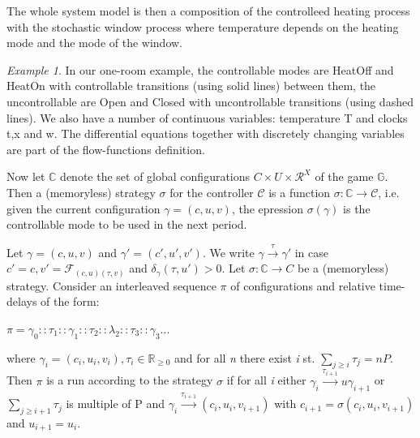     The whole system model is then a composition of the controlleed heating process
    with the stochastic window process where temperature depends on the heating  mode 
    and the mode of the window. 


    \emph{Example 1}. In our one-room example, the controllable modes are {\color{RawSienna} HeatOff}
    and {\color{RawSienna} HeatOn} with controllable transitions (using solid lines) between
    them, the uncontrollable are {\color{RawSienna} Open} and {\color{RawSienna} Closed} with
    uncontrollable transitions (using dashed lines). We also have a number of continuous 
    variables: temperature T and clocks t,x and w. The differential equations together with
    discretely changing variables are part of the flow-functions definition.

    Now let $\mathbb{C}$ denote the set of global configurations $C\times U \times \mathcal{R}^X$
    of the game $\mathbb{G}$. Then a (memoryless) strategy $\sigma$ for the controller $\mathcal{C}$
    is a function $\sigma: \mathbb{C} \rightarrow \mathcal{C}$, i.e. given the current
    configuration $\gamma = (c,u,v)$, the epression $\sigma(\gamma)$ is the controllable mode
    to be used in the next period.

    Let $\gamma = (c,u,v)$ and $\gamma' = (c',u',v')$. We write $\gamma \xrightarrow{\tau} \gamma'$ 
    in case $c'=c, v'=\mathcal{F}_{(c,u)(\tau,v)}$ and $\delta_{\gamma}(\tau,u') > 0$. Let $\sigma: \mathbb{C} \rightarrow C$
    be a (memoryless) strategy. Consider an interleaved sequence $\pi$ of configurations and
    relative time-delays of the form:
    
    \begin{center}
      $\pi = \gamma_0 :: \tau_1 :: \gamma_1 :: \tau_2 :: \lambda_2 :: \tau_3 :: \gamma_3 ...$  
    \end{center}


    where $\gamma_i = (c_i,u_i,v_i), \tau_i \in \mathbb{R}_{\geqslant 0}$ and for all \emph{n} 
    there  exist \emph{i} st. $\sum_{j \geqslant i}\tau_j = nP$. Then $\pi$ is a run according
    to the strategy $\sigma$ if for all \emph{i} either $\gamma_i \xrightarrow{\tau_{i+1}}u \gamma_{i+1}$
    or $\sum_{j \geqslant i+1}\tau_j$ is multiple of P and $\gamma_i \xrightarrow{\tau_{i+1}} (c_i,u_i,v_{i+1})$
    with $c_{i+1} = \sigma(c_i,u_i,v_{i+1})$ and $u_{i+1}=u_i$.

